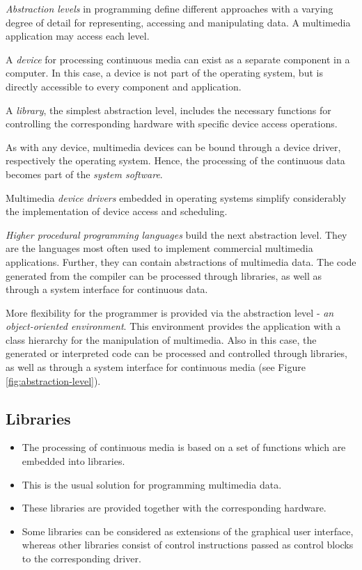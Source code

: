 \begin{multicols}{2}
		\textit{Abstraction levels} in programming define different approaches with a varying degree of detail for representing, accessing and manipulating data. A multimedia application may access each level.	
		
		A \textit{device} for processing continuous media can exist as a separate component in a computer. In this case, a device is not part of the operating system, but is directly accessible to every component and application. 
		
		A \textit{library}, the simplest abstraction level, includes the necessary functions for controlling the corresponding hardware with specific device access operations.
		
		As with any device, multimedia devices can be bound through a device driver, respectively the operating system. Hence, the processing of the continuous data becomes part of the \textit{system software}.
		
		Multimedia \textit{device drivers} embedded in operating systems simplify considerably the implementation of device access and scheduling.
		
		\textit{Higher procedural programming languages} build the next abstraction level. They are the languages most often used to implement commercial multimedia applications. Further, they can contain abstractions of multimedia data. The code generated from the compiler can be processed through libraries, as well as through a system interface for continuous data.
		
		More flexibility for the programmer is provided via the abstraction level - \textit{an object-oriented environment}. This environment provides the application with a class hierarchy for the manipulation of multimedia. Also in this case, the generated or interpreted code can be processed and controlled through libraries, as well as through a system interface for continuous media (see Figure {\ref{fig:abstraction-level}}).
	
\end{multicols}

\subsection{Libraries}

\begin{multicols}{2}
	\begin{itemize}
		\item The processing of continuous media is based on a set of functions which are embedded into libraries. 
		\item This is the usual solution for programming multimedia data. 
		\item These libraries are provided together with the corresponding hardware.
		\item Some libraries can be considered as extensions of the graphical user interface, whereas other libraries consist of control instructions passed as control blocks to the corresponding driver.
	\end{itemize}
\end{multicols}
	


